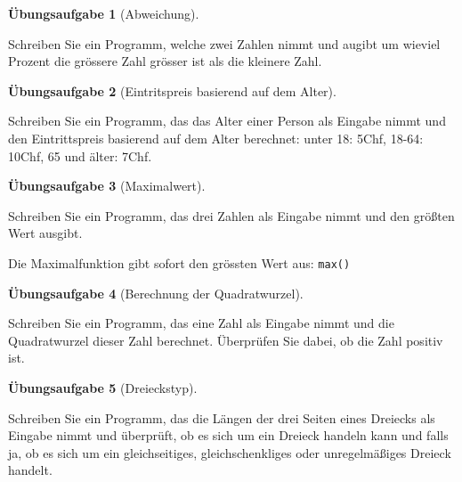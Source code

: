 \documentclass[
  10pt,
  a4paper,
  DIV=11]{scrartcl}
\theoremstyle{definition}
\newtheorem{exercise}{Übungsaufgabe}[section]
\theoremstyle{remark}
\begin{document}
\begin{exercise}[Abweichung]\protect\hypertarget{exr-line}{}\label{exr-line}

Schreiben Sie ein Programm, welche zwei Zahlen nimmt und augibt um
wieviel Prozent die grössere Zahl grösser ist als die kleinere Zahl.

\end{exercise}

\begin{exercise}[Eintritspreis basierend auf dem
Alter]\protect\hypertarget{exr-line}{}\label{exr-line}

Schreiben Sie ein Programm, das das Alter einer Person als Eingabe nimmt
und den Eintrittspreis basierend auf dem Alter berechnet: unter 18:
5Chf, 18-64: 10Chf, 65 und älter: 7Chf.

\end{exercise}

\begin{exercise}[Maximalwert]\protect\hypertarget{exr-line}{}\label{exr-line}

Schreiben Sie ein Programm, das drei Zahlen als Eingabe nimmt und den
größten Wert ausgibt.

\begin{tcolorbox}[enhanced jigsaw, colback=white, opacitybacktitle=0.6, left=2mm, breakable, rightrule=.15mm, leftrule=.75mm, title=\textcolor{quarto-callout-tip-color}{\faLightbulb}\hspace{0.5em}{Maximalfunktion}, coltitle=black, toptitle=1mm, colbacktitle=quarto-callout-tip-color!10!white, titlerule=0mm, bottomrule=.15mm, bottomtitle=1mm, colframe=quarto-callout-tip-color-frame, toprule=.15mm, opacityback=0, arc=.35mm]

Die Maximalfunktion gibt sofort den grössten Wert aus: \texttt{max()}

\end{tcolorbox}

\end{exercise}

\begin{exercise}[Berechnung der
Quadratwurzel]\protect\hypertarget{exr-line}{}\label{exr-line}

Schreiben Sie ein Programm, das eine Zahl als Eingabe nimmt und die
Quadratwurzel dieser Zahl berechnet. Überprüfen Sie dabei, ob die Zahl
positiv ist.

\end{exercise}

\begin{exercise}[Dreieckstyp]\protect\hypertarget{exr-line}{}\label{exr-line}

Schreiben Sie ein Programm, das die Längen der drei Seiten eines
Dreiecks als Eingabe nimmt und überprüft, ob es sich um ein Dreieck
handeln kann und falls ja, ob es sich um ein gleichseitiges,
gleichschenkliges oder unregelmäßiges Dreieck handelt.

\end{exercise}
\end{document}
